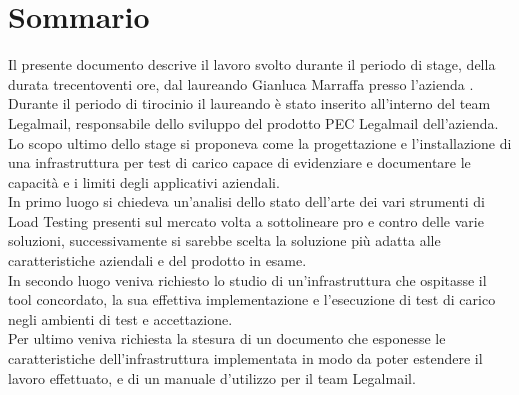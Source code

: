 
\cleardoublepage
{}
{}
\begingroup
\let\clearpage\relax
\let\cleardoublepage\relax
\let\cleardoublepage\relax

\chapter*{Sommario}

Il presente documento descrive il lavoro svolto durante il periodo di stage, della durata trecentoventi ore, dal laureando Gianluca Marraffa presso l'azienda \myCompany. \\
Durante il periodo di tirocinio il laureando è stato inserito all'interno del team Legalmail, responsabile dello sviluppo del prodotto PEC Legalmail dell'azienda.\\
Lo scopo ultimo dello stage si proponeva come la progettazione e l'installazione di una infrastruttura per test di carico capace di evidenziare e documentare le capacità e i limiti degli applicativi aziendali.\\
In primo luogo si chiedeva un'analisi dello stato dell'arte dei vari strumenti di Load Testing presenti sul mercato volta a sottolineare pro e contro delle varie soluzioni, successivamente si sarebbe scelta la soluzione più adatta alle caratteristiche aziendali e del prodotto in esame. \\
In secondo luogo veniva richiesto lo studio di un'infrastruttura che ospitasse il tool concordato, la sua effettiva implementazione e l'esecuzione di test di carico negli ambienti di test e accettazione. \\
Per ultimo veniva richiesta la stesura di un documento che esponesse le caratteristiche dell'infrastruttura implementata in modo da poter estendere il lavoro effettuato, e di un manuale d'utilizzo per il team Legalmail.

%
%

\endgroup			

\vfill

